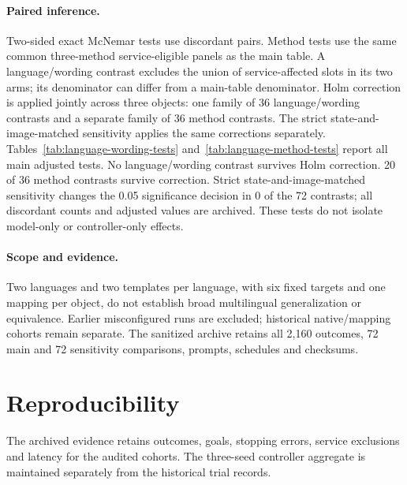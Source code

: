 

\paragraph{Paired inference.}
Two-sided exact McNemar tests use discordant pairs. Method tests use the same common three-method service-eligible panels as the main table. A language/wording contrast excludes the union of service-affected slots in its two arms; its denominator can differ from a main-table denominator. Holm correction is applied jointly across three objects: one family of 36 language/wording contrasts and a separate family of 36 method contrasts. The strict state-and-image-matched sensitivity applies the same corrections separately. Tables~\ref{tab:language-wording-tests} and~\ref{tab:language-method-tests} report all main adjusted tests. No language/wording contrast survives Holm correction. 20 of 36 method contrasts survive correction. Strict state-and-image-matched sensitivity changes the 0.05 significance decision in 0 of the 72 contrasts; all discordant counts and adjusted values are archived. These tests do not isolate model-only or controller-only effects.



\paragraph{Scope and evidence.}
Two languages and two templates per language, with six fixed targets and one mapping per object, do not establish broad multilingual generalization or equivalence. Earlier misconfigured runs are excluded; historical native/mapping cohorts remain separate. The sanitized archive retains all 2,160 outcomes, 72 main and 72 sensitivity comparisons, prompts, schedules and checksums.

\section{Reproducibility}
The archived evidence retains outcomes, goals, stopping errors, service exclusions and latency for the audited cohorts. The three-seed controller aggregate is maintained separately from the historical trial records.

